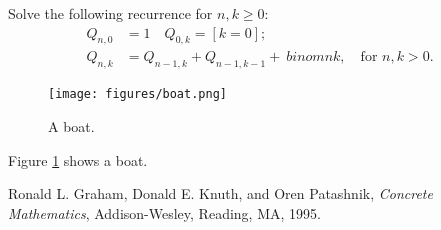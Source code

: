 \documentclass{article}
\begin{document}
Solve the following recurrence for $n,k\geq 0$:
\begin{align*}
  Q_{n,0} &= 1\quad Q_{0,k} = [k=0];   \\Q_{n,k} &= Q_{n-1,k}+Q_{n-1,k -1}+\ binom{n}{k}, \quad\text{for $n,k >0$.}
\end{align*}

\begin{figure}
  \texttt{[image: figures/boat.png]}
  \caption{A boat.}
  \label{fig:boat1}
\end{figure}

Figure \ref{fig:boat1} shows a boat.

\begin{thebibliography}{9}
Ronald L. Graham, Donald E. Knuth, and  Oren  Patashnik,
\textit{Concrete  Mathematics},
Addison-Wesley, Reading, MA, 1995.
\end{thebibliography}
\end{document}
